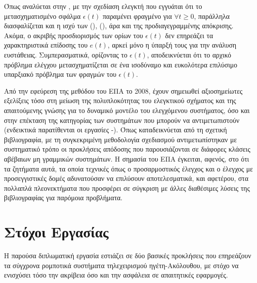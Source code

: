Όπως αναλύεται στην \cite{bechlioulis2008robust}, με την σχεδίαση ελεγκτή που εγγυάται ότι το μετασχηματισμένο σφάλμα $\epsilon(t)$ παραμένει φραγμένο για $\forall t \geq 0$, παράλληλα διασφαλίζεται και η ισχύ των (), (), άρα και της προδιαγεγραμμένης απόκρισης. Ακόμα, ο ακριβής προσδιορισμός των ορίων του $\epsilon(t)$ δεν επηρεάζει τα χαρακτηριστικά επίδοσης του $e(t)$, αρκεί μόνο η ύπαρξή τους για την ανάλυση ευστάθειας. Συμπερασματικά, ορίζοντας το $\epsilon(t)$, αποδεικνύεται ότι το αρχικό πρόβλημα ελέγχου μετασχηματίζεται σε ένα ισοδύναμο και ευκολότερα επιλύσιμο υπαρξιακό πρόβλημα των φραγμών του $\epsilon(t)$.

\bigskip
Από την εφεύρεση της μεθόδου του ΕΠΑ το 2008, έχουν σημειωθεί αξιοσημείωτες εξελίξεις τόσο στη μείωση της πολυπλοκότητας του ελεγκτικού σχήματος και της απαιτούμενης γνώσης για το δυναμικό μοντέλο του ελεγχόμενου συστήματος, όσο και στην επέκταση της κατηγορίας των συστημάτων που μπορούν να αντιμετωπιστούν (ενδεικτικά παρατίθενται οι εργασίες \cite{author2009adaptive}-\cite{katsoukis2021low}). Όπως καταδεικνύεται από τη σχετική βιβλιογραφία, με τη συγκεκριμένη μεθοδολογία σχεδιασμού αντιμετωπίστηκαν με συστηματικό τρόπο οι προκλήσεις απόδοσης που παρουσιάζονται σε διάφορες κλάσεις αβέβαιων μη γραμμικών συστημάτων. Η σημασία του ΕΠΑ έγκειται, αφενός, στο ότι τα ζητήματα αυτά, τα οποία τεχνικές όπως ο προσαρμοστικός έλεγχος και ο έλεγχος με προσεγγιστικές δομές αδυνατούσαν να επιλύσουν αποτελεσματικά, και αφετέρου, στα πολλαπλά πλεονεκτήματα που προσφέρει σε σύγκριση με άλλες διαθέσιμες λύσεις της βιβλιογραφίας για παρόμοια προβλήματα.




\section{Στόχοι Εργασίας} \label{Chapter1Section3}

Η παρούσα διπλωματική εργασία εστιάζει σε δύο βασικές προκλήσεις που επηρεάζουν τα σύγχρονα ρομποτικά συστήματα τηλεχειρισμού ηγέτη-Ακόλουθου, με στόχο να ενισχύσει τόσο την ακρίβεια όσο και την ασφάλεια σε απαιτητικές εφαρμογές.

